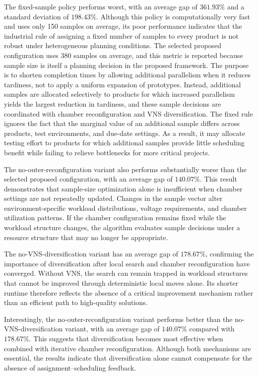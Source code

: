 The fixed-sample policy performs worst, with an average gap of \(361.93\%\) and a standard deviation of \(198.43\%\). Although this policy is computationally very fast and uses only 150 samples on average, its poor performance indicates that the industrial rule of assigning a fixed number of samples to every product is not robust under heterogeneous planning conditions. The selected proposed configuration uses 380 samples on average, and this metric is reported because sample size is itself a planning decision in the proposed framework. The purpose is to shorten completion times by allowing additional parallelism when it reduces tardiness, not to apply a uniform expansion of prototypes. Instead, additional samples are allocated selectively to products for which increased parallelism yields the largest reduction in tardiness, and these sample decisions are coordinated with chamber reconfiguration and VNS diversification. The fixed rule ignores the fact that the marginal value of an additional sample differs across products, test environments, and due-date settings. As a result, it may allocate testing effort to products for which additional samples provide little scheduling benefit while failing to relieve bottlenecks for more critical projects.

The no-outer-reconfiguration variant also performs substantially worse than the selected proposed configuration, with an average gap of \(140.07\%\). This result demonstrates that sample-size optimization alone is insufficient when chamber settings are not repeatedly updated. Changes in the sample vector alter environment-specific workload distributions, voltage requirements, and chamber utilization patterns. If the chamber configuration remains fixed while the workload structure changes, the algorithm evaluates sample decisions under a resource structure that may no longer be appropriate.

The no-VNS-diversification variant has an average gap of \(178.67\%\), confirming the importance of diversification after local search and chamber reconfiguration have converged. Without VNS, the search can remain trapped in workload structures that cannot be improved through deterministic local moves alone. Its shorter runtime therefore reflects the absence of a critical improvement mechanism rather than an efficient path to high-quality solutions.

Interestingly, the no-outer-reconfiguration variant performs better than the no-VNS-diversification variant, with an average gap of \(140.07\%\) compared with \(178.67\%\). This suggests that diversification becomes most effective when combined with iterative chamber reconfiguration. Although both mechanisms are essential, the results indicate that diversification alone cannot compensate for the absence of assignment--scheduling feedback.

